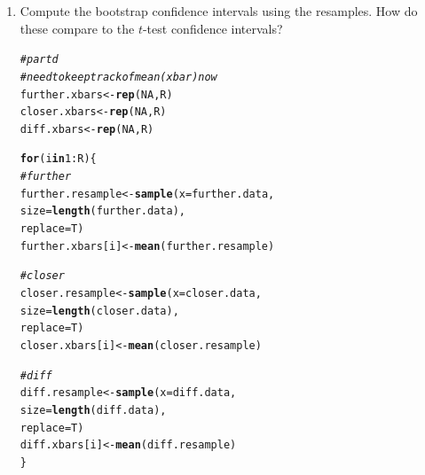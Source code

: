 \documentclass{article}\usepackage[]{graphicx}\usepackage[]{xcolor}
\makeatletter
\newcommand{\hlnum}[1]{\textcolor[rgb]{0.686,0.059,0.569}{#1}}%
\newcommand{\hlcom}[1]{\textcolor[rgb]{0.678,0.584,0.686}{\textit{#1}}}%
\newcommand{\hlopt}[1]{\textcolor[rgb]{0,0,0}{#1}}%
\newcommand{\hldef}[1]{\textcolor[rgb]{0.345,0.345,0.345}{#1}}%
\newcommand{\hlkwa}[1]{\textcolor[rgb]{0.161,0.373,0.58}{\textbf{#1}}}%
\newcommand{\hlkwb}[1]{\textcolor[rgb]{0.69,0.353,0.396}{#1}}%
\newcommand{\hlkwc}[1]{\textcolor[rgb]{0.333,0.667,0.333}{#1}}%
\newcommand{\hlkwd}[1]{\textcolor[rgb]{0.737,0.353,0.396}{\textbf{#1}}}%
\newenvironment{kframe}{%
 \def\at@end@of@kframe{}%
 \ifinner\ifhmode%
  \def\at@end@of@kframe{\end{minipage}}%
  \begin{minipage}{\columnwidth}%
 \fi\fi%
 \def\FrameCommand##1{\hskip\@totalleftmargin \hskip-\fboxsep
 \colorbox{shadecolor}{##1}\hskip-\fboxsep
     \hskip-\linewidth \hskip-\@totalleftmargin \hskip\columnwidth}%
 \MakeFramed {\advance\hsize-\width
   \@totalleftmargin\z@ \linewidth\hsize
   \@setminipage}}%
 {\par\unskip\endMakeFramed%
 \at@end@of@kframe}
\newenvironment{knitrout}{}{} %
\makeatother
\begin{document}
\begin{enumerate}
\begin{enumerate}
  \item Compute the bootstrap confidence intervals using the resamples. How do these 
  compare to the $t$-test confidence intervals? \\
\begin{knitrout}
\color{fgcolor}\begin{kframe}
\begin{alltt}
\hlcom{# part d}
\hlcom{# need to keep track of mean (xbar) now}
\hldef{further.xbars} \hlkwb{<-} \hlkwd{rep}\hldef{(}\hlnum{NA}\hldef{, R)}
\hldef{closer.xbars} \hlkwb{<-} \hlkwd{rep}\hldef{(}\hlnum{NA}\hldef{, R)}
\hldef{diff.xbars} \hlkwb{<-} \hlkwd{rep}\hldef{(}\hlnum{NA}\hldef{, R)}

\hlkwa{for} \hldef{(i} \hlkwa{in} \hlnum{1}\hlopt{:}\hldef{R)\{}
\hlcom{# further}
\hldef{further.resample} \hlkwb{<-} \hlkwd{sample}\hldef{(}\hlkwc{x} \hldef{= further.data,}
                           \hlkwc{size}\hldef{=} \hlkwd{length}\hldef{(further.data),}
                           \hlkwc{replace} \hldef{= T)}
\hldef{further.xbars[i]} \hlkwb{<-} \hlkwd{mean}\hldef{(further.resample)}

\hlcom{# closer}
\hldef{closer.resample} \hlkwb{<-} \hlkwd{sample}\hldef{(}\hlkwc{x} \hldef{= closer.data,}
                          \hlkwc{size}\hldef{=} \hlkwd{length}\hldef{(closer.data),}
                          \hlkwc{replace} \hldef{= T)}
\hldef{closer.xbars[i]} \hlkwb{<-} \hlkwd{mean}\hldef{(closer.resample)}

\hlcom{# diff}
\hldef{diff.resample} \hlkwb{<-} \hlkwd{sample}\hldef{(}\hlkwc{x} \hldef{= diff.data,}
                        \hlkwc{size}\hldef{=} \hlkwd{length}\hldef{(diff.data),}
                        \hlkwc{replace} \hldef{= T)}
\hldef{diff.xbars[i]} \hlkwb{<-} \hlkwd{mean}\hldef{(diff.resample)}
\hldef{\}}


\end{alltt}
\end{kframe}
\end{knitrout}
\end{enumerate}
\end{enumerate}
\end{document}
